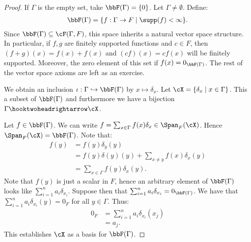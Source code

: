         \begin{proof}
            If $\Gamma$ is the empty set, take $\bbF(\Gamma) = \{0\}$. Let $\Gamma \neq \emptyset$. Define:
                \begin{equation*}
                \begin{split}
                    \bbF(\Gamma) = \{f:\Gamma \rightarrow F \mid \supp(f) < \infty\}.
                \end{split}
                \end{equation*}
            Since $\bbF(\Gamma) \subseteq \cF(\Gamma,F)$, this space inherits a natural vector space structure. In particular, if $f,g$ are finitely supported functions and $c \in F$, then $(f+g)(x) = f(x) + f(x)$ and $(cf)(x) = c f(x)$ will be finitely supported. Moreover, the zero element of this set if $f(x) = 0_{\bbF(\Gamma)}$. The rest of the vector space axioms are left as an exercise.

            We obtain an inclusion $\iota: \Gamma \hookrightarrow \bbF(\Gamma)$ by $x \mapsto \delta_x$. Let $\cX = \{\delta_x \mid x \in \Gamma\}$. This a subset of $\bbF(\Gamma)$ and furthermore we have a bijection $\Gamma \hooktwoheadrightarrow \cX$.

            Let $f \in \bbF(\Gamma)$. We can write $f = \sum_{x \in \Gamma}f(x)\delta_x \in \Span_F(\cX)$. Hence $\Span_F(\cX) = \bbF(\Gamma)$. Note that:
                \begin{equation*}
                \begin{split}
                    f(y)
                    & = f(y)\delta_y(y) \\
                    & = f(y)\delta(y)(y) + \sum_{x \neq y}f(x)\delta_x(y) \\
                    & = \sum_{x \in \Gamma}f(y)\delta_x(y).
                \end{split}
                \end{equation*}
            Note that $f(y)$ is just a scalar in $F$, hence an arbitrary element of $\bbF(\Gamma)$ looks like $\sum_{i = 1}^n a_i \delta_{x_i}$. Suppose then that $\sum_{i = 1}^n a_i \delta_{x_i} = 0_{\bbF(\Gamma)}$. We have that $\sum_{i = 1}^n a_i \delta_{x_i}(y) = 0_F$ for all $y \in \Gamma$. Thus:
                \begin{equation*}
                \begin{split}
                    0_F 
                    & = \sum_{i = 1}^n a_i \delta_{x_i}(x_j) \\
                    & = a_j.
                \end{split}
                \end{equation*}
            This establishes $\cX$ as a basis for $\bbF(\Gamma)$.


\end{proof}
